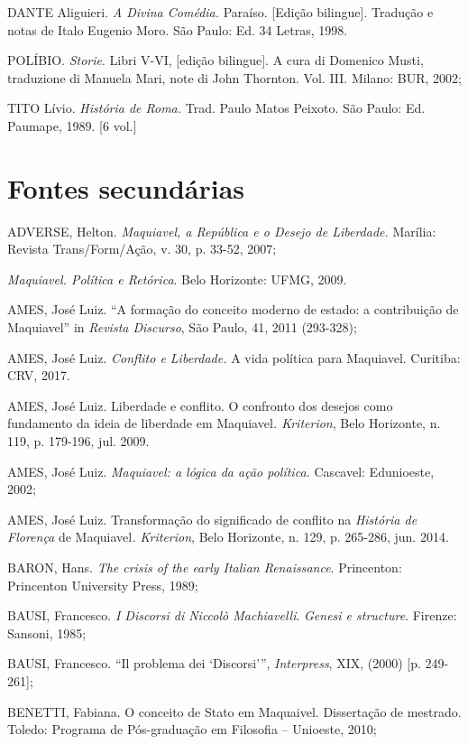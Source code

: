 DANTE Aliguieri. \emph{A Divina Comédia.} Paraíso. {[}Edição
bilingue{]}. Tradução e notas de Italo Eugenio Moro. São Paulo: Ed. 34
Letras, 1998.

POLÍBIO. \emph{Storie}. Libri V-VI, {[}edição bilingue{]}. A cura di
Domenico Musti, traduzione di Manuela Mari, note di John Thornton. Vol.
III. Milano: BUR, 2002;

TITO Lívio. \emph{História de Roma.} Trad. Paulo Matos Peixoto. São
Paulo: Ed. Paumape, 1989. {[}6 vol.{]}

\section*{Fontes secundárias}

ADVERSE, Helton. \emph{Maquiavel, a República e o Desejo de Liberdade.}
Marília: Revista Trans/Form/Ação, v. 30, p. 33-52, 2007;

\emph{Maquiavel. Política e Retórica}. Belo Horizonte: UFMG, 2009.

AMES, José Luiz. ``A formação do conceito moderno de estado: a
contribuição de Maquiavel'' in \emph{Revista Discurso}, São Paulo, 41,
2011 (293-328);

AMES, José Luiz. \emph{Conflito e Liberdade.} A vida política para
Maquiavel. Curitiba: CRV, 2017.

AMES, José Luiz. Liberdade e conflito. O confronto dos desejos como
fundamento da ideia de liberdade em Maquiavel\emph{. Kriterion}, Belo
Horizonte, n. 119, p. 179-196, jul. 2009.

AMES, José Luiz. \emph{Maquiavel: a lógica da ação política.} Cascavel:
Edunioeste, 2002;

AMES, José Luiz. Transformação do significado de conflito na
\emph{História de Florença} de Maquiavel\emph{. Kriterion}, Belo
Horizonte, n. 129, p. 265-286, jun. 2014.

BARON, Hans. \emph{The crisis of the early Italian Renaissance}.
Princenton: Princenton University Press, 1989;

BAUSI, Francesco. \emph{I Discorsi di Niccolò Machiavelli}. \emph{Genesi
e structure}. Firenze: Sansoni, 1985;

BAUSI, Francesco. ``Il problema dei `Discorsi''', \emph{Interpress},
XIX, (2000) {[}p. 249-261{]};

BENETTI, Fabiana. O conceito de Stato em Maquaivel. Dissertação de
mestrado. Toledo: Programa de Pós-graduação em Filosofia -- Unioeste,
2010;

